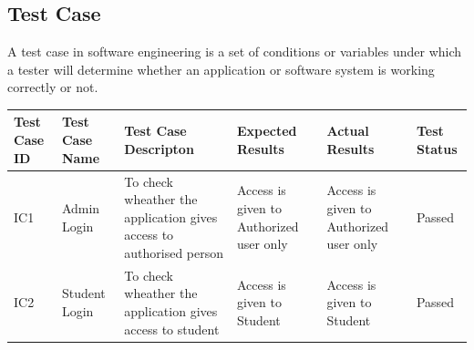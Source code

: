 \documentclass[oneside,a4paper,12pt]{report}
\begin{document}
\subsection{Test Case}
\hspace*{0.3in}A test case in software engineering is a set of conditions or variables under which a tester will determine whether an application or software system is working correctly or not.\\
\begin{table}[h]
\centering
\begin{tabular}{|p{0.7in}|p{0.7in}|p{1.2in}|p{0.8in}|p{0.8in}|p{0.5in}|}
\hline	  
Test Case ID  & Test Case Name &Test Case \newline Descripton &Expected Results &Actual \newline Results &Test Status
\\
\hline	  
IC1  & Admin Login &To check \newline wheather the \newline application gives access to authorised person &Access is \newline given to \newline Authorized user only & Access is \newline given to \newline Authorized user only&Passed
\\
\hline	
IC2 &	Student Login &	To check \newline wheather the \newline application gives access to student&	Access is \newline given to \newline Student	& Access is \newline given to \newline Student &	Passed


\end{tabular}
\end{table}
\end{document}
